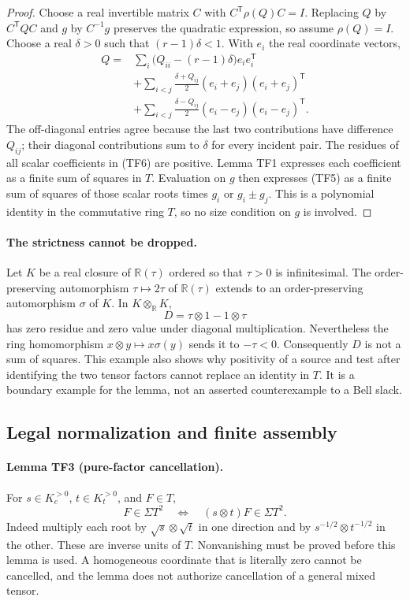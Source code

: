 \begin{proof}
Choose a real invertible matrix $C$ with
$C^{\mathsf T}\rho(Q)C=I$. Replacing $Q$ by
$C^{\mathsf T}QC$ and $g$ by $C^{-1}g$ preserves the quadratic
expression, so assume $\rho(Q)=I$. Choose a real $\delta>0$ such
that $(r-1)\delta<1$. With $e_i$ the real coordinate vectors,
\[
\begin{split}
 Q={}&\sum_i\bigl(Q_{ii}-(r-1)\delta\bigr)e_ie_i^{\mathsf T}\\
 &+\sum_{i<j}\frac{\delta+Q_{ij}}2
                (e_i+e_j)(e_i+e_j)^{\mathsf T}\\
 &+\sum_{i<j}\frac{\delta-Q_{ij}}2
                (e_i-e_j)(e_i-e_j)^{\mathsf T}.
\end{split}
 \tag{TF6}
\]
The off-diagonal entries agree because the last two contributions
have difference $Q_{ij}$; their diagonal contributions sum to
$\delta$ for every incident pair. The residues of all scalar
coefficients in (TF6) are positive. Lemma TF1 expresses each
coefficient as a finite sum of squares in $T$. Evaluation on $g$
then expresses (TF5) as a finite sum of squares of those scalar roots
times $g_i$ or $g_i\pm g_j$. This is a polynomial identity in the
commutative ring $T$, so no size condition on $g$ is involved.
\end{proof}

\paragraph{The strictness cannot be dropped.}
Let $K$ be a real closure of $\mathbb R(\tau)$ ordered so that
$\tau>0$ is infinitesimal. The order-preserving automorphism
$\tau\mapsto2\tau$ of $\mathbb R(\tau)$ extends to an
order-preserving automorphism $\sigma$ of $K$. In $K\otimes_{\mathbb R}K$,
\[
                  D=\tau\otimes1-1\otimes\tau
 \tag{TF7}
\]
has zero residue and zero value under diagonal multiplication.
Nevertheless the ring homomorphism
$x\otimes y\mapsto x\sigma(y)$ sends it to $-\tau<0$.
Consequently $D$ is not a sum of squares. This example also shows
why positivity of a source and test after identifying the two tensor
factors cannot replace an identity in $T$. It is a boundary example
for the lemma, not an asserted counterexample to a Bell slack.

\subsection{Legal normalization and finite assembly}
\paragraph{Lemma TF3 (pure-factor cancellation).}
For $s\in K_c^{>0}$, $t\in K_t^{>0}$, and $F\in T$,
\[
 F\in\Sigma T^2\quad\Longleftrightarrow\quad
                  (s\otimes t)F\in\Sigma T^2.
 \tag{TF8}
\]
Indeed multiply each root by $\sqrt s\otimes\sqrt t$ in one
direction and by $s^{-1/2}\otimes t^{-1/2}$ in the other.
These are inverse units of $T$. Nonvanishing must be proved before
this lemma is used. A homogeneous coordinate that is literally zero
cannot be cancelled, and the lemma does not authorize cancellation
of a general mixed tensor.

